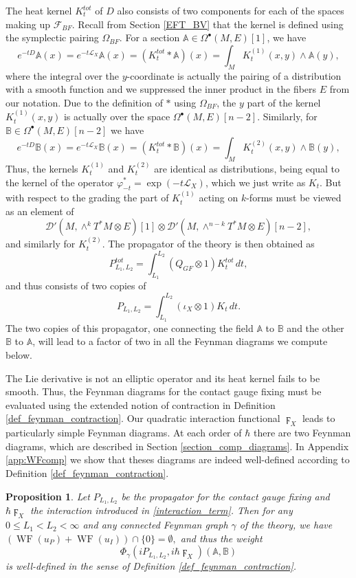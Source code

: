 \documentclass[reqno]{amsart}
\newtheorem{prop}[thm]{Proposition}
\theoremstyle{definition}
\theoremstyle{remark}
\renewcommand{\phi}{\varphi}
\newcommand{\A}{\mathbb{A}}
\newcommand{\B}{\mathbb{B}}
\newcommand{\D}{\mathcal{D}'}
\newcommand{\F}{\mathcal{F}}
\renewcommand{\L}{\mathcal{L}}
\DeclareMathOperator{\WF}{WF}
\begin{document}
The heat kernel $K_t^{tot}$ of $D$ also consists of two components for each of the spaces making up $\F_{BF}$. Recall from Section \ref{EFT_BV} that the kernel is defined using the symplectic pairing $\Omega_{BF}$. For a section $\A\in\Omega^\bullet(M,E)[1]$, we have
$$e^{-tD}\A(x) = e^{-t\L_X}\A(x) = (K_t^{tot}*\A)(x) = \int_M K_t^{(1)}(x,y)\wedge\A(y),$$
where the integral over the $y$-coordinate is actually the pairing of a distribution with a smooth function and we suppressed the inner product in the fibers $E$ from our notation. Due to the definition of $*$ using $\Omega_{BF}$, the $y$ part of the kernel $K_t^{(1)}(x,y)$ is actually over the space $\Omega^\bullet(M,E)[n-2]$.
Similarly, for $\B\in\Omega^\bullet(M,E)[n-2]$ we have
$$e^{-tD}\B(x) = e^{-t\L_X}\B(x) = (K_t^{tot}*\B)(x) = \int_M K_t^{(2)}(x,y)\wedge\B(y),$$
Thus, the kernels $K_t^{(1)}$ and $K_t^{(2)}$ are identical as distributions, being equal to the kernel of the operator $\phi_{-t}^* = \exp(-t\L_X)$, which we just write as $K_t$. But with respect to the grading the part of $K_t^{(1)}$ acting on $k$-forms must be viewed as an element of 
$$\D(M,\wedge^kT^*M\otimes E)[1]\otimes\D(M,\wedge^{n-k}T^*M\otimes E)[n-2],$$
and similarly for $K_t^{(2)}$. The propagator of the theory is then obtained as
$$P^{tot}_{L_1,L_2} = \int_{L_1}^{L_2} (Q_{GF}\otimes1)K^{tot}_t\,dt,$$
and thus consists of two copies of
\begin{equation}
\label{propagator_scales}
    P_{L_1,L_2} = \int_{L_1}^{L_2} (\iota_X\otimes1)K_t\,dt.
\end{equation}
The two copies of this propagator, one connecting the field $\A$ to $\B$ and the other $\B$ to $\A$, will lead to a factor of two in all the Feynman diagrams we compute below.

The Lie derivative is not an elliptic operator and its heat kernel fails to be smooth. Thus, the Feynman diagrams for the contact gauge fixing must be evaluated using the extended notion of contraction in Definition \ref{def_feynman_contraction}. Our quadratic interaction functional $\digamma_X$ leads to particularly simple Feynman diagrams. At each order of $\hbar$ there are two Feynman diagrams, which are described in Section \ref{section_comp_diagrams}. In Appendix \ref{app:WFcomp} we show that theses diagrams are indeed well-defined according to Definition \ref{def_feynman_contraction}.

\begin{prop}
\label{diagrams_well_defined}
Let $P_{L_1,L_2}$ be the propagator for the contact gauge fixing and $\hbar\digamma_X$ the interaction introduced in \eqref{interaction_term}. Then for any  $0\le L_1 < L_2 < \infty$ and any connected Feynman graph $\gamma$ of the theory, we have
$(\WF(u_P)+\WF(u_I)) \cap \{0\} = \emptyset,$
and thus the weight
$$\Phi_\gamma(iP_{L_1,L_2},i\hbar\digamma_X)(\A,\B)$$
is well-defined in the sense of Definition \ref{def_feynman_contraction}.
\end{prop}
\end{document}
